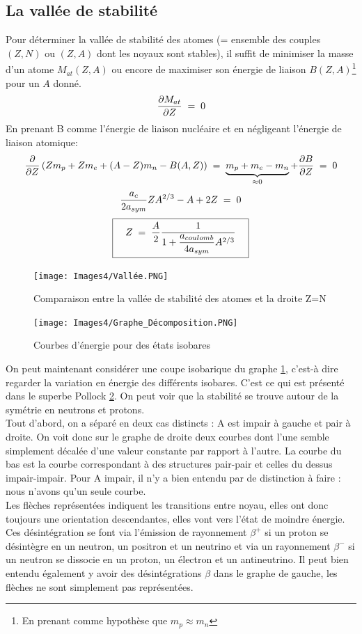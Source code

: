 \subsection{La vallée de stabilité}


Pour déterminer la vallée de stabilité des atomes (= ensemble des couples $(Z,N)$ ou $(Z,A)$ dont les noyaux sont stables), il suffit de minimiser la masse d'un atome $M_{at}(Z,A)$ ou encore de maximiser son énergie de liaison $B(Z,A)$\footnote{En prenant comme hypothèse que $m_p \approx m_n$} pour un $A$ donné.
\[
    \dfrac{\partial M_{at}}{\partial Z} \; = \; 0
\]
En prenant B comme l'énergie de liaison nucléaire et en négligeant l'énergie de liaison atomique:
\[
    \dfrac{\partial}{\partial Z}\left(Zm_p + Zm_e + (A-Z)m_n -B(A,Z)\right) 
    \; = \; \underbrace{m_p + m_e - m_n}_{\approx 0} + \dfrac{\partial B}{\partial Z}
    \; = \; 0
\]
\[
    \dfrac{a_c}{2a_{sym}}Z A^{2/3} - A + 2Z \; = \; 0
\]
\[
    \boxed{\quad
        Z \; = \; \dfrac{A}{2} \dfrac{1}{1 + \dfrac{a_{coulomb}}{4a_{sym}}A^{2/3}}\quad
    }
\]
\begin{figure}[H]
    \centering
    \texttt{[image: Images4/Vallée.PNG]}
    \caption{Comparaison entre la vallée de stabilité des atomes et la droite Z=N}
    \label{vallee}
\end{figure}
\begin{figure}[H]
    \centering
    \texttt{[image: Images4/Graphe\_Décomposition.PNG]}
    \caption{Courbes d'énergie pour des états isobares}
    \label{decomp_noyau}
\end{figure}
On peut maintenant considérer une coupe isobarique du graphe \ref{vallee}, c'est-à dire regarder la variation en énergie des différents isobares. C'est ce qui est présenté dans le superbe Pollock \ref{decomp_noyau}. On peut voir que la stabilité se trouve autour de la symétrie en neutrons et protons.\\

Tout d'abord, on a séparé en deux cas distincts : A est impair à gauche et pair à droite. On voit donc sur le graphe de droite deux courbes dont l'une semble simplement décalée d'une valeur constante par rapport à l'autre. La courbe du bas est la courbe correspondant à des structures pair-pair et celles du dessus impair-impair. Pour A impair, il n'y a bien entendu par de distinction à faire : nous n'avons qu'un seule courbe.\\

Les flèches représentées indiquent les transitions entre noyau, elles ont donc toujours une orientation descendantes, elles vont vers l'état de moindre énergie. Ces désintégration se font via l'émission de rayonnement $\beta^+$ si un proton se désintègre en un neutron, un positron et un neutrino et via un rayonnement $\beta^-$ si un neutron se dissocie en un proton, un électron et un antineutrino. Il peut bien entendu également y avoir des désintégrations $\beta$ dans le graphe de gauche, les flèches ne sont simplement pas représentées.








